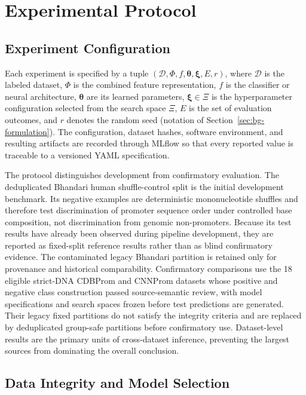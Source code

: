 \chapter{Experimental Protocol}\label{chap:experimental-protocol}

\section{Experiment Configuration}\label{sec:protocol-configuration}

Each experiment is specified by a tuple
$(\mathcal{D},\Phi,f,\boldsymbol{\theta},\boldsymbol{\xi},E,r)$, where
$\mathcal{D}$ is the labeled dataset, $\Phi$ is the combined feature
representation, $f$ is the classifier or neural architecture,
$\boldsymbol{\theta}$ are its learned parameters, $\boldsymbol{\xi}\in\Xi$ is
the hyperparameter configuration selected from the search space $\Xi$, $E$ is
the set of evaluation outcomes, and $r$ denotes the random seed (notation of
Section~\ref{sec:bg-formulation}). The configuration, dataset hashes, software environment, and resulting
artifacts are recorded through MLflow so that every reported value is traceable
to a versioned YAML specification.

The protocol distinguishes development from confirmatory evaluation. The
deduplicated Bhandari human shuffle-control split is the initial development
benchmark. Its negative examples are deterministic mononucleotide shuffles and
therefore test discrimination of promoter sequence order under controlled base
composition, not discrimination from genomic non-promoters. Because its test
results have already been observed during pipeline development, they are
reported as fixed-split reference results rather than as blind confirmatory
evidence. The contaminated legacy Bhandari partition is retained only for
provenance and historical comparability. Confirmatory comparisons use the 18
eligible strict-DNA CDBProm and CNNProm datasets whose positive and negative
class construction passed source-semantic review, with model specifications and search spaces
frozen before test predictions are generated. Their legacy fixed partitions do
not satisfy the integrity criteria and are replaced by deduplicated group-safe
partitions before confirmatory use. Dataset-level results are the
primary units of cross-dataset inference, preventing the largest sources from
dominating the overall conclusion.

\section{Data Integrity and Model Selection}\label{sec:protocol-integrity}

